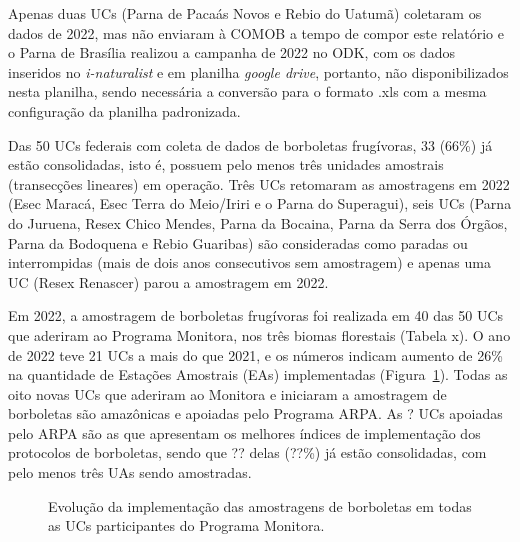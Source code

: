 \documentclass[
  letterpaper,
]{scrbook}
\begin{document}
Apenas duas UCs (Parna de Pacaás Novos e Rebio do Uatumã) coletaram os
dados de 2022, mas não enviaram à COMOB a tempo de compor este relatório
e o Parna de Brasília realizou a campanha de 2022 no ODK, com os dados
inseridos no \emph{i-naturalist} e em planilha \emph{google drive},
portanto, não disponibilizados nesta planilha, sendo necessária a
conversão para o formato .xls com a mesma configuração da planilha
padronizada.

Das 50 UCs federais com coleta de dados de borboletas frugívoras, 33
(66\%) já estão consolidadas, isto é, possuem pelo menos três unidades
amostrais (transecções lineares) em operação. Três UCs retomaram as
amostragens em 2022 (Esec Maracá, Esec Terra do Meio/Iriri e o Parna do
Superagui), seis UCs (Parna do Juruena, Resex Chico Mendes, Parna da
Bocaina, Parna da Serra dos Órgãos, Parna da Bodoquena e Rebio Guaribas)
são consideradas como paradas ou interrompidas (mais de dois anos
consecutivos sem amostragem) e apenas uma UC (Resex Renascer) parou a
amostragem em 2022.

Em 2022, a amostragem de borboletas frugívoras foi realizada em 40 das
50 UCs que aderiram ao Programa Monitora, nos três biomas florestais
(Tabela x). O ano de 2022 teve 21 UCs a mais do que 2021, e os números
indicam aumento de 26\% na quantidade de Estações Amostrais (EAs)
implementadas (Figura~\ref{fig-evolucao-implementacao}). Todas as oito
novas UCs que aderiram ao Monitora e iniciaram a amostragem de
borboletas são amazônicas e apoiadas pelo Programa ARPA. As ? UCs
apoiadas pelo ARPA são as que apresentam os melhores índices de
implementação dos protocolos de borboletas, sendo que ?? delas (??\%) já
estão consolidadas, com pelo menos três UAs sendo amostradas.

\begin{figure}[H]


\caption{\label{fig-evolucao-implementacao}Evolução da implementação das
amostragens de borboletas em todas as UCs participantes do Programa
Monitora.}

\end{figure}%
\end{document}
